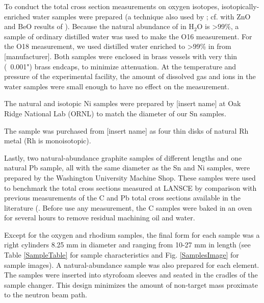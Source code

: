 To conduct the total cross section measurements on oxygen isotopes,
isotopically-enriched water samples were prepared (a technique also used by
\cite{Vaughn1965, Salisbury1965}; cf.  with ZnO and BeO results of \cite{Finlay1993}).
Because the natural abundance of \oSix in H$_{2}$O is >99\%, a sample of
ordinary distilled water was used to make the O16 measurement. For the O18
measurement, we used distilled water enriched to >99\% in \oEight from
[manufacturer]. Both samples were enclosed in brass vessels with very thin
(~0.001") brass endcaps, to minimize attenuation. At the temperature and
pressure of the experimental facility, the amount of dissolved gas and ions
in the water samples were small enough to have no effect on the measurement.

The natural and isotopic Ni samples were prepared by [insert name] at Oak Ridge National Lab 
(ORNL) to match the diameter of our Sn samples.

The \rhThree sample was purchased from [insert name] as four thin disks of natural Rh metal (Rh is
monoisotopic).

Lastly, two natural-abundance graphite samples of different lengths and one
natural Pb sample, all with the same diameter as the Sn and Ni samples, were
prepared by the Washington University Machine Shop. These
samples were used to benchmark the total cross sections measured at LANSCE by
comparison with previous measurements of the C and Pb total cross sections
available in the literature (\cite{Finlay1993,Abfalterer2001}. Before use any
measurement, the C samples were baked in an oven for several
hours to remove residual machining oil and water.

Except for the oxygen and rhodium samples, the final form for each sample was a right
cylinders 8.25 mm in diameter and ranging from 10-27 mm in length (see
Table \ref{SampleTable} for sample characteristics and Fig. \ref{SamplesImage}
for sample images). A natural-abundance sample
was also prepared for each element. The samples
were inserted into styrofoam sleeves and seated in the cradles of the sample
changer. This design minimizes the amount of non-target mass proximate to the
neutron beam path.

